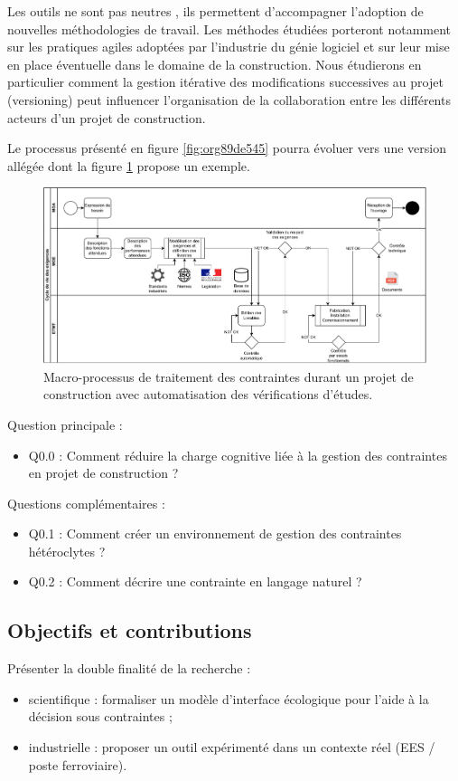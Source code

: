 \documentclass[a4paper,12pt]{article}
\begin{document}
Les outils ne sont pas neutres \autocite{borremansGuideConvivialTools1979a}, ils permettent d'accompagner l'adoption de nouvelles méthodologies de travail. Les méthodes étudiées porteront notamment sur les pratiques agiles adoptées par l'industrie du génie logiciel et sur leur mise en place éventuelle dans le domaine de la construction. Nous étudierons en particulier comment la gestion itérative des modifications successives au projet (versioning) peut influencer l'organisation de la collaboration entre les différents acteurs d'un projet de construction.

Le processus présenté en figure \ref{fig:org89de545} pourra évoluer vers une version allégée dont la figure \ref{fig:org2d77261} propose un exemple.

\begin{figure}[htbp]
\centering
\includegraphics[width=.9\linewidth]{./svg/BPMN-LifeCycle-Exigences-target.pdf}
\caption{\label{fig:org2d77261}Macro-processus de traitement des contraintes durant un projet de construction avec automatisation des vérifications d’études.}
\end{figure}

Question principale :
\begin{itemize}
\item Q0.0 : Comment réduire la charge cognitive liée à la gestion des contraintes en projet de construction ?
\end{itemize}

Questions complémentaires :
\begin{itemize}
\item Q0.1 : Comment créer un environnement de gestion des contraintes hétéroclytes ?
\item Q0.2 : Comment décrire une contrainte en langage naturel ?
\end{itemize}
\subsection{Objectifs et contributions}
\label{sec:org9c2a476}
Présenter la double finalité de la recherche :  
\begin{itemize}
\item scientifique : formaliser un modèle d’interface écologique pour l’aide à la décision sous contraintes ;
\item industrielle : proposer un outil expérimenté dans un contexte réel (EES / poste ferroviaire).
\end{itemize}
\end{document}
